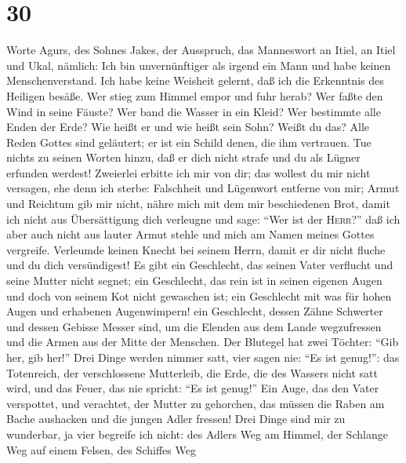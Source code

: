 \hypertarget{section-29}{%
\section{30}\label{section-29}}

 Worte Agurs, des Sohnes Jakes, der Ausspruch, das
Manneswort an Itiel, an Itiel und Ukal, nämlich:  Ich bin
unvernünftiger als irgend ein Mann und habe keinen Menschenverstand.
 Ich habe keine Weisheit gelernt, daß ich die Erkenntnis
des Heiligen besäße.  Wer stieg zum Himmel empor und fuhr
herab? Wer faßte den Wind in seine Fäuste? Wer band die Wasser in ein
Kleid? Wer bestimmte alle Enden der Erde? Wie heißt er und wie heißt
sein Sohn? Weißt du das?  Alle Reden Gottes sind
geläutert; er ist ein Schild denen, die ihm vertrauen. 
Tue nichts zu seinen Worten hinzu, daß er dich nicht strafe und du als
Lügner erfunden werdest!  Zweierlei erbitte ich mir von
dir; das wollest du mir nicht versagen, ehe denn ich sterbe:
 Falschheit und Lügenwort entferne von mir; Armut und
Reichtum gib mir nicht, nähre mich mit dem mir beschiedenen Brot,
 damit ich nicht aus Übersättigung dich verleugne und
sage: ``Wer ist der \textsc{Herr}?'' daß ich aber auch nicht aus lauter
Armut stehle und mich am Namen meines Gottes vergreife. 
Verleumde keinen Knecht bei seinem Herrn, damit er dir nicht fluche und
du dich versündigest!  Es gibt ein Geschlecht, das seinen
Vater verflucht und seine Mutter nicht segnet;  ein
Geschlecht, das rein ist in seinen eigenen Augen und doch von seinem Kot
nicht gewaschen ist;  ein Geschlecht mit was für hohen
Augen und erhabenen Augenwimpern!  ein Geschlecht, dessen
Zähne Schwerter und dessen Gebisse Messer sind, um die Elenden aus dem
Lande wegzufressen und die Armen aus der Mitte der Menschen.
 Der Blutegel hat zwei Töchter: ``Gib her, gib her!''
Drei Dinge werden nimmer satt, vier sagen nie: ``Es ist genug!'':
 das Totenreich, der verschlossene Mutterleib, die Erde,
die des Wassers nicht satt wird, und das Feuer, das nie spricht: ``Es
ist genug!''  Ein Auge, das den Vater verspottet, und
verachtet, der Mutter zu gehorchen, das müssen die Raben am Bache
aushacken und die jungen Adler fressen!  Drei Dinge sind
mir zu wunderbar, ja vier begreife ich nicht:  des Adlers
Weg am Himmel, der Schlange Weg auf einem Felsen, des Schiffes Weg
